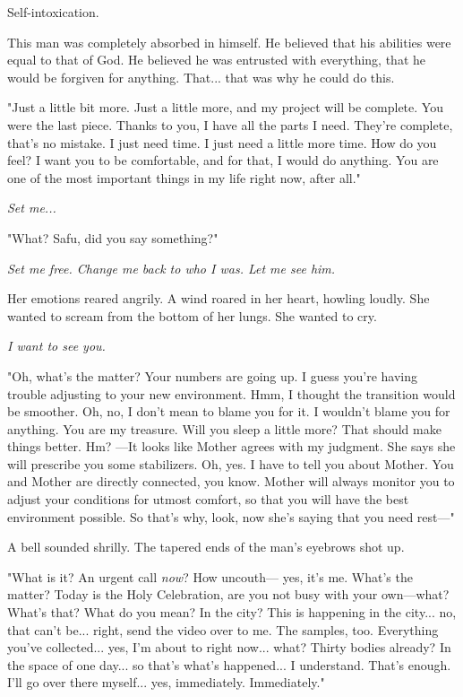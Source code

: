 Self-intoxication.

This man was completely absorbed in himself. He believed that his
abilities were equal to that of God. He believed he was entrusted with
everything, that he would be forgiven for anything. That... that was why
he could do this.

"Just a little bit more. Just a little more, and my project will be
complete. You were the last piece. Thanks to you, I have all the parts I
need. They're complete, that's no mistake. I just need time. I just need
a little more time. How do you feel? I want you to be comfortable, and
for that, I would do anything. You are one of the most important things
in my life right now, after all."

\emph{Set me...}

"What? Safu, did you say something?"

\emph{Set me free. Change me back to who I was. Let me see him.}

Her emotions reared angrily. A wind roared in her heart, howling loudly.
She wanted to scream from the bottom of her lungs. She wanted to cry.

\emph{I want to see you.}

"Oh, what's the matter? Your numbers are going up. I guess you're having
trouble adjusting to your new environment. Hmm, I thought the transition
would be smoother. Oh, no, I don't mean to blame you for it. I wouldn't
blame you for anything. You are my treasure. Will you sleep a little
more? That should make things better. Hm? ---It looks like Mother agrees
with my judgment. She says she will prescribe you some stabilizers. Oh,
yes. I have to tell you about Mother. You and Mother are directly
connected, you know. Mother will always monitor you to adjust your
conditions for utmost comfort, so that you will have the best
environment possible. So that's why, look, now she's saying that you
need rest---"

A bell sounded shrilly. The tapered ends of the man's eyebrows shot up.

"What is it? An urgent call \emph{now}? How uncouth--- yes, it's me. What's the
matter? Today is the Holy Celebration, are you not busy with your
own---what? What's that? What do you mean? In the city? This is happening
in the city... no, that can't be... right, send the video over to me.
The samples, too. Everything you've collected... yes, I'm about to right
now... what? Thirty bodies already? In the space of one day... so that's
what's happened... I understand. That's enough. I'll go over there
myself... yes, immediately. Immediately."

